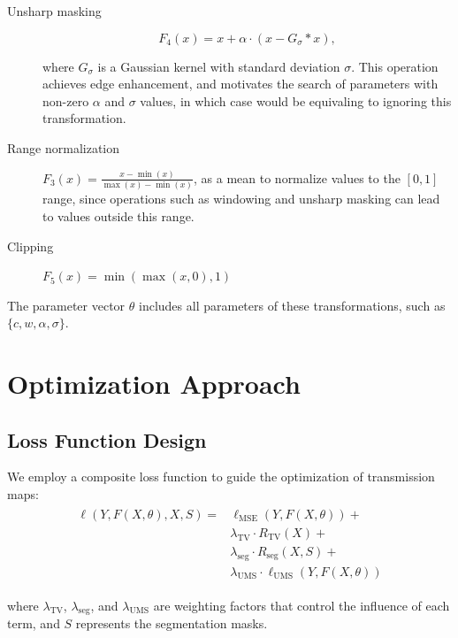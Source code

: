 \documentclass[nomenclature, english, bibtex]{kththesis}
\numberwithin{listing}{chapter}
\begin{document}
\begin{description}
\item[Unsharp masking]
\begin{equation}
    F_4(x) = x + \alpha \cdot (x - G_\sigma * x),
\end{equation}

where $G_\sigma$ is a Gaussian kernel with standard deviation $\sigma$.
This operation achieves edge enhancement, and motivates the search of parameters with non-zero $\alpha$ and $\sigma$ values,
in which case would be equivaling to ignoring this transformation.

\item[Range normalization] $F_3(x) = \frac{x - \min(x)}{\max(x) - \min(x)}$, as a mean to normalize values to the $[0,1]$
range, since operations such as windowing and unsharp masking can lead to values outside this range.

\item[Clipping] $F_5(x) = \min(\max(x, 0), 1)$
\end{description}

The parameter vector $\theta$ includes all parameters of these transformations, such as $\{c, w, \alpha, \sigma\}$.

\section{Optimization Approach}
\subsection{Loss Function Design}
We employ a composite loss function to guide the optimization of transmission maps:
\begin{align}
    \begin{split}
    \ell(Y, F(X, \theta), X, S) = &\ell_{\text{MSE}}(Y, F(X, \theta)) +  \\
                                &\lambda_{\text{TV}} \cdot R_{\text{TV}}(X) + \\
                                &\lambda_{\text{seg}} \cdot R_{\text{seg}}(X, S) + \\
                                &\lambda_{\text{UMS}} \cdot \ell_{\text{UMS}}(Y, F(X, \theta))
    \end{split}
\end{align}

where $\lambda_{\text{TV}}$, $\lambda_{\text{seg}}$, and $\lambda_{\text{UMS}}$ are weighting factors that control the influence of each term, and $S$ represents the segmentation masks.
\end{document}
